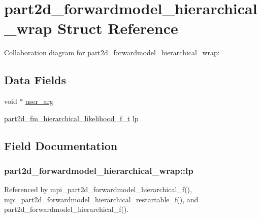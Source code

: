 \hypertarget{structpart2d__forwardmodel__hierarchical__wrap}{}\section{part2d\+\_\+forwardmodel\+\_\+hierarchical\+\_\+wrap Struct Reference}
\label{structpart2d__forwardmodel__hierarchical__wrap}


Collaboration diagram for part2d\+\_\+forwardmodel\+\_\+hierarchical\+\_\+wrap\+:
\subsection*{Data Fields}
\begin{DoxyCompactItemize}
\item 
void $\ast$ \hyperlink{structpart2d__forwardmodel__hierarchical__wrap_ab765763b700646ef1af8c7f9f680b597}{user\+\_\+arg}
\item 
\hyperlink{forwardmodel__f_8h_aedc329ee15e3ed51547031b619ae6949}{part2d\+\_\+fm\+\_\+hierarchical\+\_\+likelihood\+\_\+f\+\_\+t} \hyperlink{structpart2d__forwardmodel__hierarchical__wrap_a87b4b8397dea3c7ccf9434378903efee}{lp}
\end{DoxyCompactItemize}


\subsection{Field Documentation}
\subsubsection[{\texorpdfstring{lp}{lp}}]{ part2d\+\_\+forwardmodel\+\_\+hierarchical\+\_\+wrap\+::lp}\hypertarget{structpart2d__forwardmodel__hierarchical__wrap_a87b4b8397dea3c7ccf9434378903efee}{}\label{structpart2d__forwardmodel__hierarchical__wrap_a87b4b8397dea3c7ccf9434378903efee}


Referenced by mpi\+\_\+part2d\+\_\+forwardmodel\+\_\+hierarchical\+\_\+f(), mpi\+\_\+part2d\+\_\+forwardmodel\+\_\+hierarchical\+\_\+restartable\+\_\+f(), and part2d\+\_\+forwardmodel\+\_\+hierarchical\+\_\+f().

